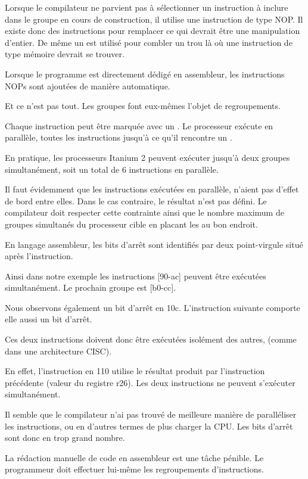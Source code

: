 Lorsque le compilateur ne parvient pas à sélectionner un instruction à inclure dans le groupe en 
cours de construction, il utilise une instruction de type \ac{NOP}. Il existe donc des instructions 
 pour remplacer ce qui devrait être une manipulation d'entier. De même un  est 
utilisé pour combler un trou là où une instruction de type mémoire devrait se trouver.

Lorsque le programme est directement dédigé en assembleur, les instructions \ac{NOP}s sont ajoutées 
de manière automatique.

Et ce n'est pas tout. Les groupes font eux-mêmes l'objet de regroupements.

Chaque instruction peut être marquée avec un . Le processeur exécute en parallèle, toutes 
les instructions jusqu'à ce qu'il rencontre un .

En pratique, les processeurs Itanium 2 peuvent exécuter jusqu'à deux groupes simultanément, soit un 
total de  6 instructions en parallèle.

Il faut évidemment que les instructions exécutées en parallèle, n'aient  pas d'effet de bord entre 
elles. Dans le cas contraire, le résultat n'est pas défini. 
Le compilateur doit respecter cette contrainte ainsi que le nombre maximum de groupes simultanés du 
processeur cible en placant les  au bon endroit.

En langage assembleur, les bits d'arrêt sont identifiés par deux point-virgule situé après 
l'instruction.

Ainsi dans notre exemple les instructions [90-ac] peuvent être exécutées simultanément. Le prochain 
groupe est [b0-cc].

Nous observons également un bit d'arrêt en 10c. L'instruction suivante comporte elle aussi un bit 
d'arrêt.

Ces deux instructions doivent donc être exécutées isolément des autres, (comme dans une architecture 
\ac{CISC}).

En effet, l'instruction en 110 utilise le résultat produit par l'instruction précédente (valeur du 
registre r26). Les deux instructions ne peuvent s'exécuter simultanément.

Il semble que le compilateur n'ai pas trouvé de meilleure manière de paralléliser les instructions,
ou en d'autres termes de plus charger la \ac{CPU}. Les bits d'arrêt sont donc en trop grand nombre.

La rédaction manuelle de code en assembleur est une tâche pénible. Le programmeur doit effectuer 
lui-même les regroupements d'instructions.

